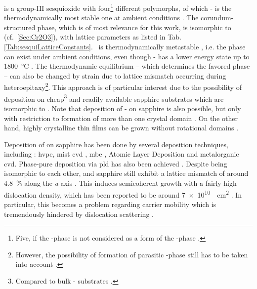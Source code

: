  is a group-III sesquioxide with four\footnote{
    Five, if the \textdelta-phase is not considered as a form of the \textkappa-phase \cite{hassa2021a}.
} different polymorphs, of which \textbeta- is the thermodynamically most stable one at ambient conditions
    \cite{schewski2015,hassa2021a,petersen2023}.
The corundum-structured \agao{} phase, which is of most relevance for this work, is isomorphic to  (cf.~\ref{Sec:Cr2O3}), with lattice parameters as listed in Tab.\,\ref{Tab:sesquiLatticeConstants}.
\agao\ is thermodynamically metastable
    \cite{kaneko2023},
i.e. the phase can exist under ambient conditions, even though \textbeta- has a lower energy state up to \qty{1800}{\degreeCelsius}
    \cite{pearton2018}.
The thermodynamic equilibrium -- which determines the favored phase -- can also be changed by strain due to lattice mismatch occurring during heteroepitaxy\footnote{
    However, the possibility of formation of parasitic \textbeta-phase still has to be taken into account
        \cite{petersen2023}.
}.
    \cite{petersen2023}
This approach is of particular interest due to the possibility of deposition on cheap\footnote{
    Compared to bulk \textbeta- substrates
        \cite{yang2022,kaneko2023}.
}
and readily available sapphire substrates which are isomorphic to \agao{}
    \cite{pearton2018,polyakov2022,kaneko2023}.
Note that deposition of \textbeta- on sapphire is also possible, but only with restriction to formation of more than one crystal domain
    \cite{yang2022}.
On the other hand, highly crystalline
    \cite{pearton2018}
\agao{} thin films can be grown without rotational domains
    \cite{yang2022,petersen2023}.

Deposition of \agao{} on sapphire has been done by several deposition techniques, including \cite{yang2022}:
    \gls{hvpe},
    mist \gls{cvd}
        \cite{kaneko2012},
    \gls{mbe}
        \cite{schewski2015},
    Atomic Layer Deposition and
    metalorganic \gls{cvd}.
Phase-pure deposition via \gls{pld} has also been achieved
    \cite{schewski2015,petersen2023,vogt2023}.
Despite being isomorphic to each other, \agao{} and sapphire still exhibit a lattice mismatch of around \qty{4.8}{\percent} along the \textit{a}-axis
    \cite{kaneko2023}.
This induces semicoherent growth with a fairly high dislocation density, which has been reported to be around \qty{7e10}{\per\square\cm}
    \cite{kaneko2012}.
In particular, this becomes a problem regarding carrier mobility which is tremendously hindered by dislocation scattering
    \cite{kaneko2023}.

